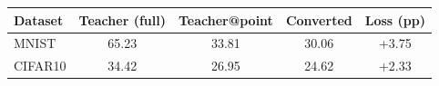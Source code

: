\begin{tabular}{lcccc}\hline
Dataset & Teacher (full) & Teacher@point & Converted & Loss (pp) \\\hline
MNIST & 65.23 & 33.81 & 30.06 & +3.75 \\
CIFAR10 & 34.42 & 26.95 & 24.62 & +2.33 \\
\hline\end{tabular}
